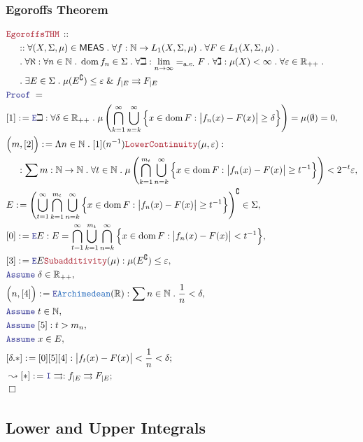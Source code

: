 \documentclass[12pt]{scrartcl}
\newcommand{\TYPE}[1]{\textcolor{NavyBlue}{\mathtt{#1}}}
\newcommand{\LOGIC}[1]{\textcolor{Blue}{\mathtt{#1}}}
\newcommand{\THM}[1]{\textcolor{Maroon}{\mathtt{#1}}}
\renewcommand{\.}{\; . \;}
\newcommand{\de}{: \kern 0.1pc =}
\newcommand{\Theorem}[2]{& \THM{#1} \, :: \, #2 \\ & \Proof = \\ }
\newcommand{\NewLine}{\\ & \kern 1pc}
\newcommand{\Page}[1]{ \begin{align*} #1 \end{align*}   }
\renewcommand{\And}{\; \& \;}
\newcommand{\Intro}{\LOGIC{I}}
\newcommand{\Elim}{\LOGIC{E}}
\newcommand{\Reals}{\mathbb{R} }
\newcommand{\Nat}{\mathbb{N} }
\renewcommand{\c}{\complement}
\newcommand{\Say}[3]{& #1 \de #2 : #3, \\}
\newcommand{\SayIn}[3]{& #1 \de #2 \in #3, \\}
\newcommand{\Conclude}[3]{& #1 \de #2 : #3; \\}
\newcommand{\DeriveConclude}[3]{& \leadsto #1 \de #2 : #3 ; \\}
\newcommand{\Assume}[2]{& \LOGIC{Assume} \; #1 : #2, \\}
\newcommand{\AssumeIn}[2]{& \LOGIC{Assume} \; #1 \in #2, \\}
\newcommand{\QED}{\; \square}
\newcommand{\EndProof}{& \QED \\}
\newcommand{\Proof}{\LOGIC{Proof} \; }
\DeclareMathOperator*{\dom}{dom}
\renewcommand{\ae}{\mathrm{a.e.}}
\newcommand{\MEAS}{\mathsf{MEAS}}
\begin{document}
\subsubsection{Egoroffs Theorem}
\Page{
	\Theorem{EgoroffsTHM}{
		\NewLine ::		
		\forall (X,\Sigma,\mu) \in \MEAS \.
		\forall f : \Nat \to L_1(X,\Sigma,\mu) \.
		\forall F \in L_1(X,\Sigma,\mu) \. \NewLine \.
		\forall \aleph : \forall n \in \Nat \. \dom f_n \in \Sigma \.
		\forall \beth : \lim_{n \to \infty} =_\ae F \.	
		\forall \gimel : \mu(X) < \infty \.
		\forall \varepsilon \in \Reals_{++} \. \NewLine \.
		\exists E \in \Sigma \.
		\mu(E^\c) \le \varepsilon \And
		f_{|E}  \rightrightarrows F_{|E}
 	}
 	\Say{[1]}{\Elim \beth}
 	{
 		\forall \delta \in \Reals_{++} \. 
 		\mu\left( 
 		\bigcap^\infty_{k=1} 
 		\bigcup^\infty_{n=k} \Big\{ x \in \dom F : \big|f_n(x) - F(x)\big|\ge\delta  \Big\} \right)
 		= \mu(\emptyset) = 0
 	}
 	\Say{\Big(m,[2]\Big)}{\Lambda n \in \Nat \. [1](n^{-1}) \THM{LowerContinuity}(\mu,\varepsilon)}
 	{
		\NewLine : 		
 		\sum m : \Nat \to \Nat \.
 		\forall t \in \Nat \.
 		\mu\left( 
 			\bigcap^{m_t}_{k=1}
 			\bigcup^{\infty}_{n=k} 
 			\Big\{ x \in \dom F : \big|f_n(x) - F(x)\big|\ge t^{-1}  \Big\} 
 		\right) < 2^{-t}\varepsilon
 	}
 	\SayIn{E}
 	{
 		\left(
		\bigcup^\infty_{t=1} 		
 		\bigcap^{m_t}_{k=1} 
 		\bigcup^{\infty}_{n=k} \Big\{ x \in \dom F : \big|f_n(x) - F(x)\big| \ge t^{-1}  \Big\}
 		\right)^\c
 	}{\Sigma}
 	\Say{[0]}{\Elim E}
 	{
 		E = \bigcap^\infty_{t=1} \bigcup^{m_t}_{k=1} 
 		\bigcap^{\infty}_{n=k} \Big\{ x \in \dom F : \big|f_n(x) - F(x)\big| < t^{-1}  \Big\}
 	}
 	\Say{[3]}{\Elim E \THM{Subadditivity}(\mu)}
 	{
 		\mu(E^\c) \le \varepsilon
 	}
 	\AssumeIn{\delta}{\Reals_{++}}
 	\Say{\Big(n,[4]\Big)}{\Elim \TYPE{Archimedean}(\Reals)}
 	{	
 		\sum n \in \Nat \. \frac{1}{n} < \delta
 	}
 	\AssumeIn{t}{\Nat}
 	\Assume{[5]}{t > m_n}
 	\AssumeIn{x}{E}
 	\Conclude{[\delta.*]}{[0][5][4]}
 	{
 		\big| f_t(x) - F(x) \big| < \frac{1}{n} < \delta
 	}
 	\DeriveConclude{[*]}{\Intro \rightrightarrows}
 	{
 		f_{|E}  \rightrightarrows F_{|E}
 	}
 	\EndProof
}
\newpage
\subsection{Lower and Upper Integrals}
\end{document}
